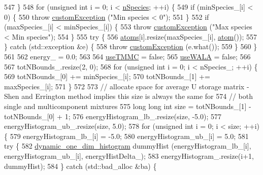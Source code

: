 \begin{DoxyCode}
547     \}
548     \textcolor{keywordflow}{for} (\textcolor{keywordtype}{unsigned} \textcolor{keywordtype}{int} i = 0; i < \hyperlink{classsim_system_ab5e2e9b6204de15520302fe1d51688dd}{nSpecies}; ++i) \{
549         \textcolor{keywordflow}{if} (minSpecies\_[i] < 0) \{
550             \textcolor{keywordflow}{throw} \hyperlink{classcustom_exception}{customException} (\textcolor{stringliteral}{"Min species < 0"});
551         \}
552         \textcolor{keywordflow}{if} (maxSpecies\_[i] < minSpecies\_[i]) \{
553             \textcolor{keywordflow}{throw} \hyperlink{classcustom_exception}{customException} (\textcolor{stringliteral}{"Max species < Min species"});
554         \}
555         \textcolor{keywordflow}{try} \{
556             \hyperlink{classsim_system_a90421b19082f7fb8fc23b7264b1161e4}{atoms}[i].resize(maxSpecies\_[i], \hyperlink{classatom}{atom}());
557         \} \textcolor{keywordflow}{catch} (std::exception &e) \{
558             \textcolor{keywordflow}{throw} \hyperlink{classcustom_exception}{customException} (e.what());
559         \}
560     \}
561 
562     energy\_ = 0.0;
563 
564     \hyperlink{classsim_system_aa474a50b6353c8897331b1ab1ce53ab1}{useTMMC} = \textcolor{keyword}{false};
565     \hyperlink{classsim_system_aa83b00006b3919fb6e13f1bdeadece6a}{useWALA} = \textcolor{keyword}{false};
566 
567     totNBounds\_.resize(2, 0);
568     \textcolor{keywordflow}{for} (\textcolor{keywordtype}{unsigned} \textcolor{keywordtype}{int} i = 0; i < nSpecies\_; ++i) \{
569         totNBounds\_[0] += minSpecies\_[i];
570         totNBounds\_[1] += maxSpecies\_[i];
571     \}
572 
573     \textcolor{comment}{// allocate space for average U storage matrix - Shen and Errington method implies this size is always
       the same for}
574     \textcolor{comment}{// both single and multicomponent mixtures}
575     \textcolor{keywordtype}{long} \textcolor{keywordtype}{long} \textcolor{keywordtype}{int} size = totNBounds\_[1] - totNBounds\_[0] + 1;
576     energyHistogram\_lb\_.resize(size, -5.0);
577     energyHistogram\_ub\_.resize(size, 5.0);
578     \textcolor{keywordflow}{for} (\textcolor{keywordtype}{unsigned} \textcolor{keywordtype}{int} i = 0; i < size; ++i) \{
579         energyHistogram\_lb\_[i] = -5.0;
580         energyHistogram\_ub\_[i] = 5.0;
581         \textcolor{keywordflow}{try} \{
582             \hyperlink{classdynamic__one__dim__histogram}{dynamic\_one\_dim\_histogram} dummyHist (energyHistogram\_lb\_[i], 
      energyHistogram\_ub\_[i], energyHistDelta\_);
583             energyHistogram\_.resize(i+1, dummyHist);
584         \} \textcolor{keywordflow}{catch} (std::bad\_alloc &ba) \{

\end{DoxyCode}
